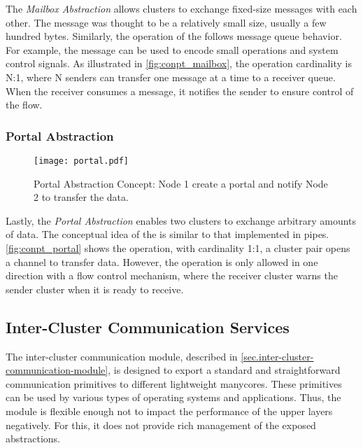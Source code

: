 				The \textit{Mailbox Abstraction} allows clusters to exchange fixed-size
				messages with each other.
				The message was thought to be a relatively small size, usually a few hundred bytes.
				Similarly, the operation of the \mailbox follows \posix message queue behavior.
				For example, the message can be used to encode small operations and system
				control signals.
				As illustrated in \autoref{fig:conpt_mailbox}, the operation cardinality is N:1,
				where N senders can transfer one message at a time to a receiver queue.
				When the receiver consumes a message, it notifies the sender to ensure
				control of the flow.

			\subsubsection*{Portal Abstraction}
			\label{sec.portal-abs}

				\begin{figure}[t]
					\centering%
					\caption{Portal Abstraction Concept: Node 1 create a portal and notify Node 2 to transfer the data.}%
					\label{fig:conpt_portal}%
					\texttt{[image: portal.pdf]}%
				\end{figure}

				Lastly, the \textit{Portal Abstraction} enables two clusters to exchange arbitrary
				amounts of data.
				The conceptual idea of the \portal is similar to that implemented in \posix pipes.
				\autoref{fig:conpt_portal} shows the \portal operation, with cardinality
				1:1, a cluster pair opens a channel to transfer data.
				However, the operation is only allowed in one direction with a flow control mechanism,
				where the receiver cluster warns the sender cluster when it is ready to receive.

		\subsection{Inter-Cluster Communication Services}
		\label{sec.inter-cluster-communication-module}

			The inter-cluster communication module, described in \autoref{sec.inter-cluster-communication-module},
			is designed to export a standard and straightforward communication
			primitives to different lightweight manycores.
			These primitives can be used by various types of operating systems
			and applications.
			Thus, the module is flexible enough not to impact the performance
			of the upper layers negatively.
			For this, it does not provide rich management of the exposed abstractions.

